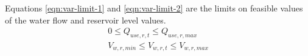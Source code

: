 Equations \ref{eqn:var-limit-1} and \ref{eqn:var-limit-2} are the limits on feasible values of the water flow and reservoir level values.
%
\begin{gather}
\label{eqn:var-limit-1}
0 \le Q_{use,r,t} \le Q_{use,r,max} \\
\label{eqn:var-limit-2}
V_{w,r,min} \le V_{w,r,t} \le V_{w,r,max} \\
\end{gather}


